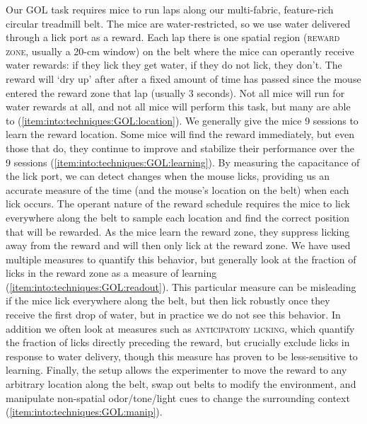 Our \ac{GOL} task requires mice to run laps along our multi-fabric, feature-rich circular treadmill belt.
The mice are water-restricted, so we use water delivered through a lick port as a reward.
Each lap there is one spatial region (\textsc{reward zone}, usually a 20-cm window) on the belt where the mice can operantly receive water rewards: if they lick they get water, if they do not lick, they don't.
The reward will `dry up' after after a fixed amount of time has passed since the mouse entered the reward zone that lap (usually 3 seconds).
Not all mice will run for water rewards at all, and not all mice will perform this task, but many are able to (\ref{item:into:techniques:GOL:location}).
We generally give the mice 9 sessions to learn the reward location.
Some mice will find the reward immediately, but even those that do, they continue to improve and stabilize their performance over the 9 sessions (\ref{item:into:techniques:GOL:learning}).
By measuring the capacitance of the lick port, we can detect changes when the mouse licks, providing us an accurate measure of the time (and the mouse's location on the belt) when each lick occurs.
The operant nature of the reward schedule requires the mice to lick everywhere along the belt to sample each location and find the correct position that will be rewarded.
As the mice learn the reward zone, they suppress licking away from the reward and will then only lick at the reward zone.
We have used multiple measures to quantify this behavior, but generally look at the fraction of licks in the reward zone as a measure of learning (\ref{item:into:techniques:GOL:readout}).
This particular measure can be misleading if the mice lick everywhere along the belt, but then lick robustly once they receive the first drop of water, but in practice we do not see this behavior.
In addition we often look at measures such as \textsc{anticipatory licking}, which quantify the fraction of licks directly preceding the reward, but crucially exclude licks in response to water delivery, though this measure has proven to be less-sensitive to learning.
Finally, the setup allows the experimenter to move the reward to any arbitrary location along the belt, swap out belts to modify the environment, and manipulate non-spatial odor/tone/light cues to change the surrounding context (\ref{item:into:techniques:GOL:manip}).

